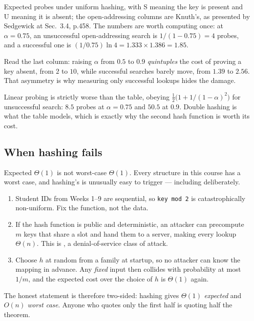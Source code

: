 \documentclass[11pt]{article}
\begin{document}
Expected probes under uniform hashing, with S meaning the key is present and U meaning it is absent; the open-addressing columns are Knuth's, as presented by Sedgewick at Sec.~3.4, p.458. The numbers are worth computing once: at $\alpha = 0.75$, an unsuccessful open-addressing search is $1/(1-0.75) = 4$ probes, and a successful one is $(1/0.75)\ln 4 = 1.333 \times 1.386 = 1.85$.

Read the last column: raising $\alpha$ from $0.5$ to $0.9$ \emph{quintuples} the cost of proving a key absent, from $2$ to $10$, while successful searches barely move, from $1.39$ to $2.56$. That asymmetry is why measuring only successful lookups hides the damage.

Linear probing is strictly worse than the table, obeying $\tfrac12\big(1 + 1/(1-\alpha)^2\big)$ for unsuccessful search: $8.5$ probes at $\alpha = 0.75$ and $50.5$ at $0.9$. Double hashing is what the table models, which is exactly why the second hash function is worth its cost.

\subsection{When hashing fails}

Expected $\Theta(1)$ is not worst-case $\Theta(1)$. Every structure in this course has a worst case, and hashing's is unusually easy to trigger --- including deliberately.

\begin{enumerate}
  \item {} Student IDs from Weeks 1--9 are sequential, so \texttt{key mod 2} is catastrophically non-uniform. Fix the function, not the data.
  \item {} If the hash function is public and deterministic, an attacker can precompute $m$ keys that share a slot and hand them to a server, making every lookup $\Theta(n)$. This is , a denial-of-service class of attack.
  \item {} Choose $h$ at random from a family at startup, so no attacker can know the mapping in advance. Any \emph{fixed} input then collides with probability at most $1/m$, and the expected cost over the choice of $h$ is $\Theta(1)$ again.
\end{enumerate}

The honest statement is therefore two-sided: hashing gives $\Theta(1)$ \emph{expected} and $O(n)$ \emph{worst case}. Anyone who quotes only the first half is quoting half the theorem.
\end{document}
